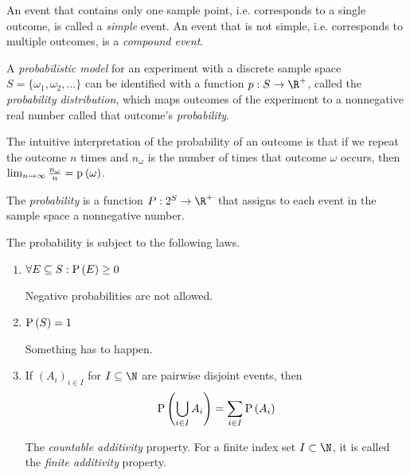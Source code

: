 \documentclass[11pt]{article}
\begin{document}
\begin{defn}
    An event that contains only one sample point, i.e. corresponds to a single
    outcome, is called a \emph{simple} event. An event that is not simple, i.e.
    corresponds to multiple outcomes, is a \emph{compound event}.
\end{defn}

\begin{defn}
    A \emph{probabilistic model} for an experiment with a discrete sample space
    $S = \{\omega_1, \omega_2, \ldots\}$
    can be identified with a function $p : S \to \R^+$, called the
    \emph{probability distribution}, which maps outcomes of the experiment to a
    nonnegative real number called that outcome's \emph{probability}.
\end{defn}

The intuitive interpretation of the probability of an outcome is that if we
repeat the outcome $n$ times and $n_\omega$ is the number of times that outcome
$\omega$ occurs, then $\lim_{n\to\infty} \frac{n_\omega}{n} = \p{\omega}$.

\begin{defn}
    The \emph{probability} is a function $P : 2^S \to \R^+$ that assigns to
    each event in the sample space a nonnegative number.

    The probability is subject to the following laws.

    \begin{enumerate}
        \item $\forall E \subseteq S : \P{E} \geq 0$

            Negative probabilities are not allowed.

        \item $\P{S} = 1$

            Something has to happen.

        \item If $(A_i)_{i\in I}$ for $I \subseteq \N$ are pairwise disjoint
            events, then
            \begin{equation}
                \P{\Union_{i \in I} A_i} = \sum_{i \in I} \P{A_i}
                \label{eq:countable-additivity}
            \end{equation}

            The \emph{countable additivity} property. For a finite index set
            $I \subset \N$, it is called the \emph{finite additivity} property.
    \end{enumerate}
\end{defn}
\end{document}
